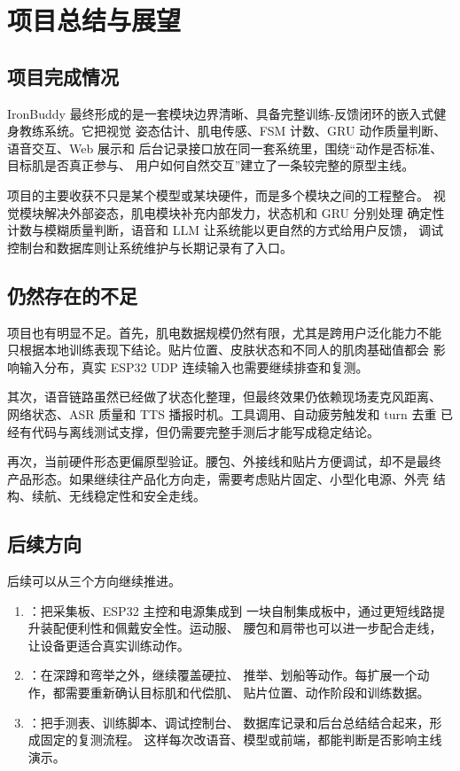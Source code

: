 \section{项目总结与展望}
\label{sec:conclusion}

\subsection{项目完成情况}

IronBuddy 最终形成的是一套模块边界清晰、具备完整训练-反馈闭环的嵌入式健身教练系统。它把视觉
姿态估计、肌电传感、FSM 计数、GRU 动作质量判断、语音交互、Web 展示和
后台记录接口放在同一套系统里，围绕“动作是否标准、目标肌是否真正参与、
用户如何自然交互”建立了一条较完整的原型主线。

项目的主要收获不只是某个模型或某块硬件，而是多个模块之间的工程整合。
视觉模块解决外部姿态，肌电模块补充内部发力，状态机和 GRU 分别处理
确定性计数与模糊质量判断，语音和 LLM 让系统能以更自然的方式给用户反馈，
调试控制台和数据库则让系统维护与长期记录有了入口。

\subsection{仍然存在的不足}

项目也有明显不足。首先，肌电数据规模仍然有限，尤其是跨用户泛化能力不能
只根据本地训练表现下结论。贴片位置、皮肤状态和不同人的肌肉基础值都会
影响输入分布，真实 ESP32 UDP 连续输入也需要继续排查和复测。

其次，语音链路虽然已经做了状态化整理，但最终效果仍依赖现场麦克风距离、
网络状态、ASR 质量和 TTS 播报时机。工具调用、自动疲劳触发和 turn 去重
已经有代码与离线测试支撑，但仍需要完整手测后才能写成稳定结论。

再次，当前硬件形态更偏原型验证。腰包、外接线和贴片方便调试，却不是最终
产品形态。如果继续往产品化方向走，需要考虑贴片固定、小型化电源、外壳
结构、续航、无线稳定性和安全走线。

\subsection{后续方向}

后续可以从三个方向继续推进。

\begin{enumerate}
    \item {}：把采集板、ESP32 主控和电源集成到
    一块自制集成板中，通过更短线路提升装配便利性和佩戴安全性。运动服、
    腰包和肩带也可以进一步配合走线，让设备更适合真实训练动作。

    \item {}：在深蹲和弯举之外，继续覆盖硬拉、
    推举、划船等动作。每扩展一个动作，都需要重新确认目标肌和代偿肌、
    贴片位置、动作阶段和训练数据。

    \item {}：把手测表、训练脚本、调试控制台、
    数据库记录和后台总结结合起来，形成固定的复测流程。
    这样每次改语音、模型或前端，都能判断是否影响主线演示。
\end{enumerate}

